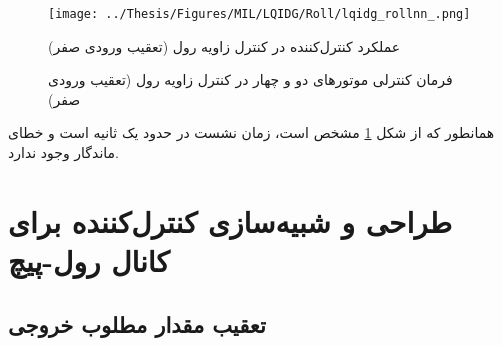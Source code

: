 \documentclass{CCI2020}
\begin{document}
	\begin{figure}[H]
		\texttt{[image: ../Thesis/Figures/MIL/LQIDG/Roll/lqidg\_rollnn\_.png]}
		\centering
		\caption{عملكرد کنترل‌کننده  در کنترل زاويه رول (تعقیب ورودی صفر)}
		\label{lqidg_roll_fig_simulation}
	\end{figure}
	\begin{figure}[H]
		\centering
		\caption{فرمان کنترلی موتورهای دو و چهار در کنترل زاویه رول (تعقیب ورودی صفر)}
	\end{figure}
	
 همانطور که از شکل
	\ref{lqidg_roll_fig_simulation}
	مشخص است، زمان نشست در حدود یک ثانیه است و خطای ماندگار وجود ندارد.
	\section{طراحی و شبیه‌سازی کنترل‌کننده برای کانال رول-پیچ}
	\subsection{تعقیب مقدار مطلوب خروجی}\label{roll_pitch_regulator}
	
\end{document}
